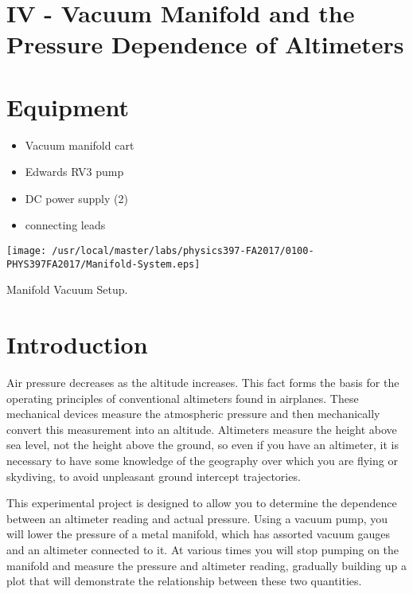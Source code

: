 \section{IV - Vacuum Manifold and the Pressure Dependence of Altimeters}

\section{Equipment}

\begin{minipage}[t]{0.5\textwidth}
\begin{itemize}[noitemsep]
\item Vacuum manifold cart
\item Edwards RV3 pump
\end{itemize}
\end{minipage}
\begin{minipage}[t]{0.5\textwidth}
\begin{itemize}[noitemsep]
\item DC power supply (2)
\item connecting leads
\end{itemize}
\end{minipage}

\begin{marginfigure}
\texttt{[image: /usr/local/master/labs/physics397-FA2017/0100-PHYS397FA2017/Manifold-System.eps]}
\caption{Manifold Vacuum Setup.}
\label{fig:VACsetup4}
\end{marginfigure}

\section{Introduction}

Air pressure decreases as the altitude increases. This fact forms the basis for the operating principles of conventional altimeters found in airplanes. These mechanical devices measure the atmospheric pressure and then mechanically convert this measurement into an altitude. Altimeters measure the height above sea level, not the height above the ground, so even if you have an altimeter, it is necessary to have some knowledge of the geography over which you are flying or skydiving, to avoid unpleasant ground intercept trajectories.

This experimental project is designed to allow you to determine the dependence between an altimeter reading and actual pressure. Using a vacuum pump, you will lower the pressure of a metal manifold, which has assorted vacuum gauges and an altimeter connected to it. At various times you will stop pumping on the manifold and measure the pressure and altimeter reading, gradually building up a plot that will demonstrate the relationship between these two quantities. 

